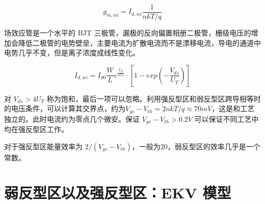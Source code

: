\documentclass[cn,11pt,chinese,black,simple]{../elegantbook}
\begin{document}
\[g_{m,wi} = I_{d,wi} \frac{1}{n k T / q}\]

场效应管是一个水平的 BJT 三极管，漏极的反向偏置相册二极管，栅级电压的增加会降低二极管的电势壁垒，主要电流为扩散电流而不是漂移电流，导电的通道中电势几乎不变，但是离子浓度成线性变化。

\[I_{d,wi} = I_{d0} \frac{W}{L} e^{\frac{V_{gs}}{nU_T}} \cdot \left[1 - exp(-\frac{V_{ds}}{U_T})\right]\] 

对 \(V_{ds} > 4 U_T\) 称为饱和，最后一项可以忽略。利用强反型区和弱反型区跨导相等时的电压条件，可以计算其交界点，约为\(V_{gs}-V_{th} = 2 n k T / q \approx 70 mV \)，这是和工艺独立的。此时电流约为零点几个微安。保证 \(V_{gs} - V_{th} > 0.2 V\) 可以保证不同工艺中均在强反型区工作。

对于强反型区能量效率为 \(2 / (V_{gs}-V_{th})\)，一般为20，弱反型区的效率几乎是一个常数。

\section{弱反型区以及强反型区：EKV 模型}


\let\chapname\undefined
\ifx\mainclass\undefined
\end{document}
